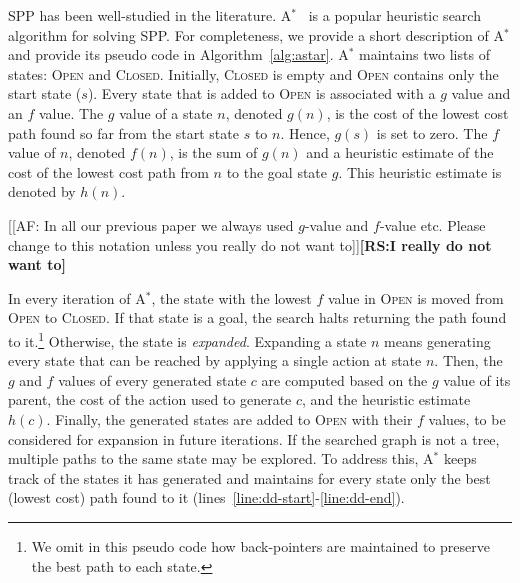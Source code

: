 \documentclass{aicom2e}
\newcommand{\astar}{A$^*$}
\newcommand{\open}{\textsc{Open}}
\newcommand{\closed}{\textsc{Closed}}
\newcommand{\roni}[1]{\textbf{[RS:#1]}}
\begin{document}
SPP has been well-studied in the literature. \astar{}~\cite{hartNR68Astar} is a popular
 heuristic search algorithm for solving SPP. For completeness, we provide a short description of \astar{}
 and provide its pseudo code in Algorithm~\ref{alg:astar}. \astar{} maintains two lists of states: \open{} and
\closed{}. Initially, \closed{} is empty and \open{} contains only the start
state ($s$). Every state that is added to \open{} is associated with a $g$
value and an $f$ value. The $g$ value of a state $n$, denoted $g(n)$, is the
cost of the lowest cost path found so far from the start state $s$ to $n$.
Hence, $g(s)$ is set to zero.
The $f$ value of $n$, denoted $f(n)$, is the sum
of $g(n)$ and a heuristic estimate of the cost of the lowest cost
path from $n$ to the goal state $g$. This heuristic estimate is denoted
by $h(n)$. %

[[AF: In all our previous paper we always used $g$-value and $f$-value etc.
Please change to this notation unless you really do not want to]]\roni{I really do not want to}

In every iteration of \astar{}, the state with the lowest $f$ value in \open{}
is moved from \open{} to \closed{}. If that state is a goal, the search halts
returning the path found to it.\footnote{We omit in this pseudo code how
back-pointers are maintained to  preserve the best path to each state.}
Otherwise, the state is {\em expanded}. Expanding a state $n$ means generating
every state that can be reached by applying a single action at state $n$. Then,
the $g$ and $f$ values of every generated state $c$ are computed based on the
$g$ value of its parent, the cost of the action used to generate $c$, and the
heuristic estimate $h(c)$. Finally, the generated states are added to \open{}
with their $f$ values, to be considered for expansion in future iterations. If
the searched graph is not a tree, multiple paths to the same state may be
explored. To address this, \astar{} keeps track of the states it has generated
and maintains for every state only the best (lowest cost) path found to it (lines~\ref{line:dd-start}-\ref{line:dd-end}).








\end{document}
